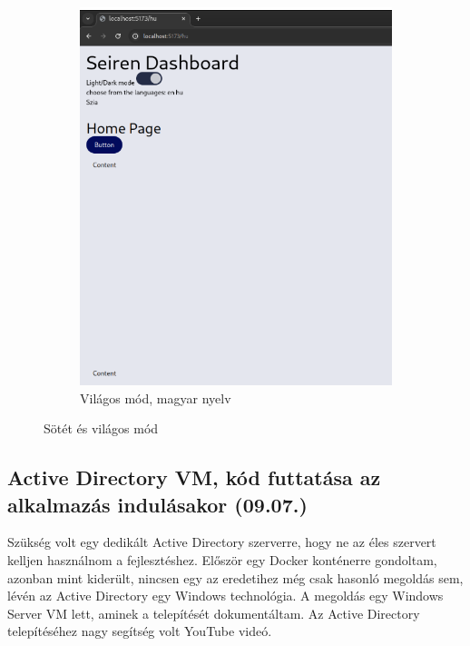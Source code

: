 \documentclass[a4paper]{article}
\begin{document}
\begin{figure}[ht]
\begin{subfigure}[b]{0.45\textwidth}
        \includegraphics[clip, trim = 0 24 0 0, width=\textwidth]{images/light_preview.png}
        \caption{Világos mód, magyar nyelv}
        \label{fig:light_mode}
    \end{subfigure}
    \caption{Sötét és világos mód}
    \label{fig:dark_light_modes}
\end{figure}

\subsection{Active Directory VM, kód futtatása az alkalmazás indulásakor (09.07.)}

Szükség volt egy dedikált Active Directory szerverre, hogy ne az éles szervert kelljen használnom a
fejlesztéshez. Először egy Docker konténerre gondoltam, azonban mint kiderült, nincsen egy az
eredetihez még csak hasonló megoldás sem, lévén az Active Directory egy Windows technológia. A
megoldás egy Windows Server VM lett, aminek a telepítését dokumentáltam. Az Active Directory
telepítéséhez nagy segítség volt  YouTube videó.
\end{document}
